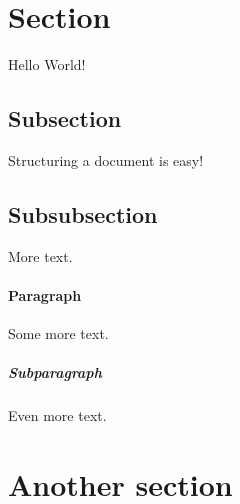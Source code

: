 \documentclass{article}
\begin{document}
	\section{Section}
	Hello World!
	\subsection{Subsection}
	Structuring a document is easy!
	\subsection{Subsubsection}
	More text.
	\paragraph{Paragraph}
	Some more text.
	\subparagraph{Subparagraph}
	Even more text.
	\section{Another section}
\end{document}
